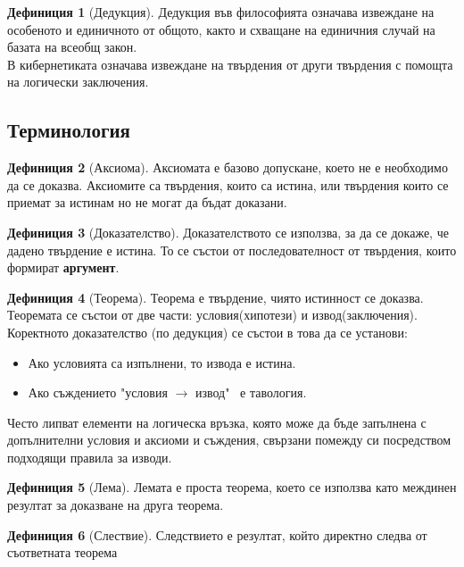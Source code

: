 \documentclass[fleqn, 12pt]{article}
\theoremstyle{definition}
\newtheorem{definition}{Дефиниция}[subsection]
\begin{document}
\begin{definition}[Дедукция]
Дедукция във философията означава извеждане на особеното и единичното от общото, както и схващане на единичния случай на базата на всеобщ закон. \\
В кибернетиката означава извеждане на твърдения от други твърдения с помощта на логически заключения.
\end{definition}

\subsection{Терминология}

\begin{definition}[Аксиома]
Аксиомата е базово допускане, което не е необходимо да се доказва. 
Аксиомите са твърдения, които са истина, или твърдения които се приемат за истинам но не могат да бъдат доказани. 
\end{definition}

\begin{definition}[Доказателство]
Доказателството се използва, за да се докаже, че дадено твърдение е истина. То се състои от последователност от твърдения, които формират \textbf{аргумент}.
\end{definition}

\begin{definition}[Теорема]
Теорема е твърдение, чиято истинност се доказва. \\
Теоремата се състои от две части: условия(хипотези) и  извод(заключения). \\
Коректното доказателство (по дедукция) се състои в това да се установи: 
\begin{itemize}
	\item Ако условията са изпълнени, то извода е истина.
	\item Ако съждението "условия $\rightarrow$ извод" \, е тавология.
\end{itemize}
Често липват елементи на логическа връзка, която може да бъде запълнена с допълнителни условия и аксиоми и съждения, свързани помежду си посредством подходящи правила за изводи. 
\end{definition}

\begin{definition}[Лема]
Лемата е проста теорема, което се използва като междинен резултат за доказване на друга теорема. 
\end{definition}

\begin{definition}[Слествие]
Следствието е резултат, който директно следва от съответната теорема
\end{definition}
\end{document}
